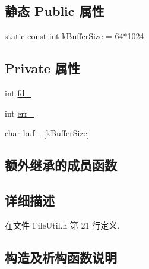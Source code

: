\subsection*{静态 Public 属性}
\begin{DoxyCompactItemize}
\item 
static const int \hyperlink{classmuduo_1_1FileUtil_1_1ReadSmallFile_a8b423a805589152d71009c594ad25ab3}{k\+Buffer\+Size} = 64$\ast$1024
\end{DoxyCompactItemize}
\subsection*{Private 属性}
\begin{DoxyCompactItemize}
\item 
int \hyperlink{classmuduo_1_1FileUtil_1_1ReadSmallFile_a4d16b31e09a7202f94eb934cde5372e5}{fd\+\_\+}
\item 
int \hyperlink{classmuduo_1_1FileUtil_1_1ReadSmallFile_a0fc9a1b2c15f28a6cbe07194e4e25c1f}{err\+\_\+}
\item 
char \hyperlink{classmuduo_1_1FileUtil_1_1ReadSmallFile_ae46aa1652cf42a27dcd3e2d6e9836efd}{buf\+\_\+} \mbox{[}\hyperlink{classmuduo_1_1FileUtil_1_1ReadSmallFile_a8b423a805589152d71009c594ad25ab3}{k\+Buffer\+Size}\mbox{]}
\end{DoxyCompactItemize}
\subsection*{额外继承的成员函数}


\subsection{详细描述}


在文件 File\+Util.\+h 第 21 行定义.



\subsection{构造及析构函数说明}
\mbox{\label{classmuduo_1_1FileUtil_1_1ReadSmallFile_acd3eba8bbc84e42edd1ad5d7be6e41bf}} 

